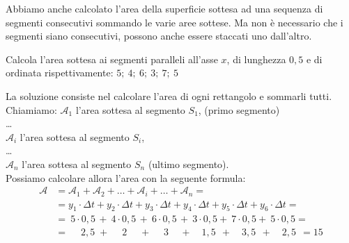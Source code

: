 Abbiamo anche calcolato l'area della superficie sottesa ad una sequenza di 
segmenti consecutivi sommando le varie aree sottese. Ma non è necessario che 
i segmenti siano consecutivi, possono anche essere staccati uno dall'altro.

\begin{esempio}
Calcola l'area sottesa ai segmenti paralleli all'asse \(x\), di lunghezza 
\(0,5\) e di ordinata rispettivamente: \quad 
\(5;~4;~6;~3;~7;~5\)

\end{esempio}

La soluzione consiste nel calcolare l'area di ogni rettangolo e sommarli 
tutti.
Chiamiamo:
\(\mathcal{A}_1\) l'area sottesa al segmento \(S_1\), 
\quad (primo segmento)\\
\dots\\
\(\mathcal{A}_i\) l'area sottesa al segmento \(S_i\),\\
\dots\\
\(\mathcal{A}_n\) l'area sottesa al segmento \(S_n\)
\quad (ultimo segmento).\\

Possiamo calcolare allora l'area con la seguente formula:
\begin{align*}
  \mathcal{A} &= \mathcal{A}_1 + \mathcal{A}_2 + \dots + 
                 \mathcal{A}_i + \dots + \mathcal{A}_n = \\
              &= y_1 \cdot \Delta t + y_2 \cdot \Delta t + 
                 y_3 \cdot \Delta t + y_4 \cdot \Delta t + 
                 y_5 \cdot \Delta t + y_6 \cdot \Delta t = \\
              &= ~5 \cdot 0,5\, + ~4 \cdot 0,5\, + ~6 \cdot 0,5\, + 
                 ~3 \cdot 0,5 + ~7 \cdot 0,5 + ~5 \cdot 0,5 = \\
              &= \quad\; 2,5 \; + \quad\; 2 \quad\; + \quad\; 3 \quad\, + 
                 \quad 1,5 \,\; + \quad 3,5 \,\; + \quad 2,5 \,\; = 15
\end{align*}

